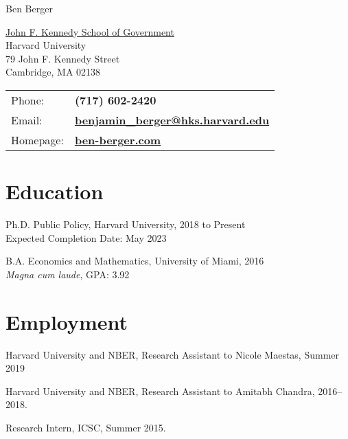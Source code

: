 \documentclass[letterpaper]{article}
\def\name{Ben Berger}
\renewenvironment{itemize}{
  \begin{list}{}{
    \setlength{\leftmargin}{1.5em}
  }
}{
  \end{list}
}
\begin{document}
{\huge \name}


\vspace{0.25in}

\begin{minipage}{0.45\linewidth}
  \href{http://www.hks.harvard.edu/}{John F. Kennedy School of Government} \\
  Harvard University \\
  79 John F. Kennedy Street \\
  Cambridge, MA 02138
\end{minipage}
\begin{minipage}{0.45\linewidth}
  \begin{tabular}{ll}
    Phone: & \bf (717) 602-2420 \\
    Email: & \href{mailto:benjamin\_berger@hks.harvard.edu}{\bf benjamin\_berger@hks.harvard.edu} \\
    Homepage: & \href{http://ben-berger.com/}{\bf ben-berger.com} \\
  \end{tabular}
\end{minipage}



\section*{Education}

\begin{itemize}
  \item Ph.D. Public Policy, Harvard University, 2018 to Present \\
  Expected Completion Date: May 2023

  \item B.A. Economics and Mathematics, University of Miami, 2016 \\
  \textit{Magna cum laude},  GPA: 3.92
\end{itemize}


\section*{Employment}

\begin{itemize}
\item Harvard University and NBER, Research Assistant to Nicole Maestas, Summer 2019
\item Harvard University and NBER, Research Assistant to Amitabh Chandra, 2016--2018.
\item Research Intern, ICSC, Summer 2015.
\end{itemize}
\end{document}
